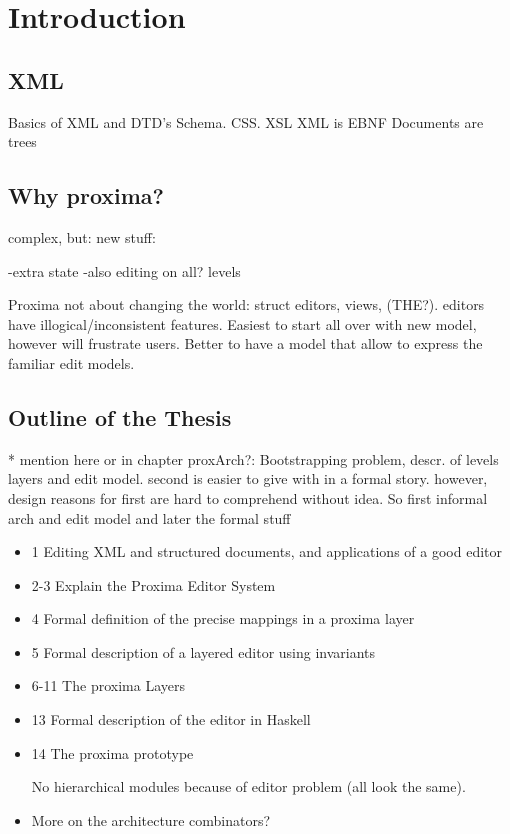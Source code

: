 \chapter{Introduction}
\label{chap:introduction}

\section{XML}
Basics of XML and DTD's  Schema. CSS. XSL
XML is EBNF 
Documents are trees


\section{Why proxima?}

complex, but:
new stuff:

-extra state
-also editing on all? levels

Proxima not about changing the world: struct editors, views, (THE?). editors have illogical/inconsistent features. Easiest to start all over with new model, however will frustrate users. Better to have a model that allow to express the familiar edit models.

\section{Outline of the Thesis}
* mention here or in chapter proxArch?:
Bootstrapping problem, descr. of levels layers and edit model. second is easier to give with in a formal story. however, design reasons for first are hard to comprehend without idea. So first informal arch and edit model and later the formal stuff

\begin{itemize}
\item 1 Editing XML and structured documents, and applications of a good editor
\item 2-3 Explain the Proxima Editor System
\item 4 Formal definition of the precise mappings in a proxima layer
\item 5 Formal description of a layered editor using invariants
\item 6-11 The proxima Layers 



\item 13 Formal description of the editor in Haskell
\item 14 The proxima prototype

No hierarchical modules because of editor problem (all look the same).

\item More on the architecture combinators?

\end{itemize}